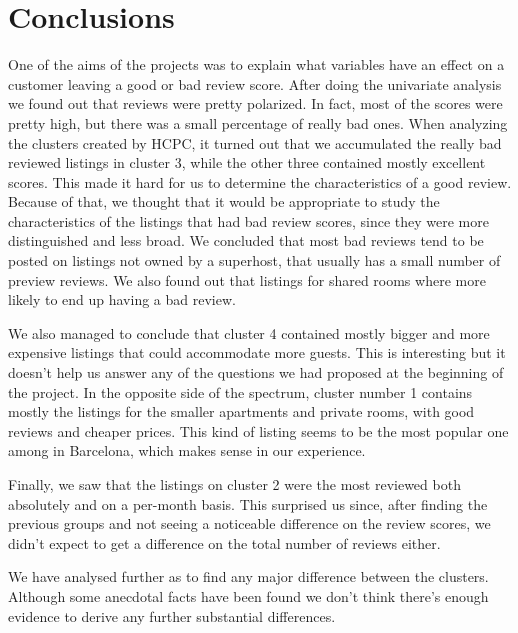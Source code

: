 

\section{Conclusions}%
\label{sec:conclusions}

One of the aims of the projects was to explain what variables have an effect on a customer leaving a good or bad review score. After doing the univariate analysis we found out that reviews were pretty polarized.  In fact, most of the scores were pretty high, but there was a small percentage of really bad ones. When analyzing the clusters created by HCPC, it turned out that we accumulated the really bad reviewed listings in cluster 3, while the other three contained mostly excellent scores. This made it hard for us to determine the characteristics of a good review. Because of that, we thought that it would be appropriate to study the characteristics of the listings that had bad review scores, since they were more distinguished and less broad. We concluded that most bad reviews tend to be posted on listings not owned by a superhost, that usually has a small number of preview reviews. We also found out that listings for shared rooms where more likely to end up having a bad review.

We also managed to conclude that cluster 4 contained mostly bigger and more expensive listings that could accommodate more guests. This is interesting but it doesn't help us answer any of the questions we had proposed at the beginning of the project.
In the opposite side of the spectrum,  cluster number 1 contains mostly the listings for the smaller apartments and private rooms, with good reviews and cheaper prices. This kind of listing seems to be the most popular one among \airbnb in Barcelona, which makes sense in our experience.

Finally, we saw that the listings on cluster 2 were the most reviewed both absolutely and on a per-month basis. This surprised us since, after finding the previous groups and not seeing a noticeable difference on the review scores, we didn't expect to get a difference on the total number of reviews either.

We have analysed further as to find any major difference between the clusters. Although some anecdotal facts have been found we don't think there's enough evidence to derive any further substantial differences.
